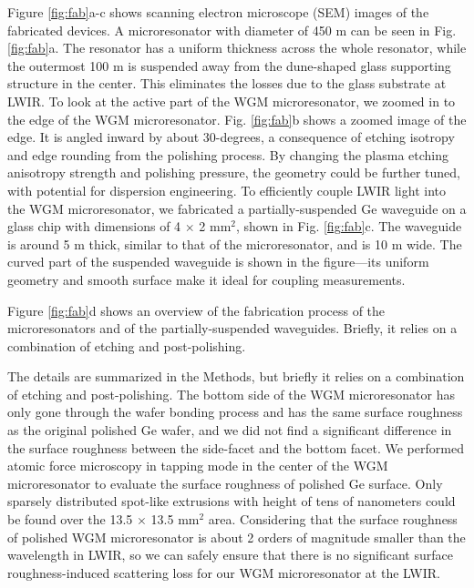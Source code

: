 \documentclass[fleqn,10pt,twocolumn]{wlscirep}
\begin{document}
Figure \ref{fig:fab}a-c shows scanning electron microscope (SEM) images of the fabricated devices. A microresonator with diameter of 450 \micro m can be seen in Fig. \ref{fig:fab}a. The resonator has a uniform thickness across the whole resonator, while the outermost 100 \micro m is suspended away from the dune-shaped glass supporting structure in the center. This eliminates the losses due to the glass substrate at LWIR. To look at the active part of the WGM microresonator, we zoomed in to the edge of the WGM microresonator. Fig. \ref{fig:fab}b shows a zoomed image of the edge. It is angled inward by about 30-degrees, a consequence of etching isotropy and edge rounding from the polishing process. By changing the plasma etching anisotropy strength and polishing pressure, the geometry could be further tuned, with potential for dispersion engineering\cite{yangBroadbandDispersionengineeredMicroresonator2016}. To efficiently couple LWIR light into the WGM microresonator, we fabricated a partially-suspended Ge waveguide on a glass chip with dimensions of 4 $\si{\times}$ 2 $\si{\mm^{2}}$, shown in Fig. \ref{fig:fab}c. The waveguide is around 5 \micro m thick, similar to that of the microresonator, and is 10 \micro m wide. The curved part of the suspended waveguide is shown in the figure---its uniform geometry and smooth surface make it ideal for coupling measurements.

Figure \ref{fig:fab}d shows an overview of the fabrication process of the microresonators and of the partially-suspended waveguides.
\ifpreprint Briefly, it relies on a combination of etching and post-polishing. \waferbonding

\nanofab
\else The details are summarized in the Methods, but briefly it relies on a combination of etching and post-polishing. 
\fi
The bottom side of the WGM microresonator has only gone through the wafer bonding process and has the same surface roughness as the original polished Ge wafer, and we did not find a significant difference in the surface roughness between the side-facet and the bottom facet. We performed atomic force microscopy in tapping mode in the center of the WGM microresonator to evaluate the surface roughness of polished Ge surface. Only sparsely distributed spot-like extrusions with height of tens of nanometers could be found over the 13.5 $\si{\times}$ 13.5 $\si{\mm^{2}}$ area. Considering that the surface roughness of polished WGM microresonator is about 2 orders of magnitude smaller than the wavelength in LWIR, so we can safely ensure that there is no significant surface roughness-induced scattering loss for our WGM microresonator at the LWIR.
\end{document}
